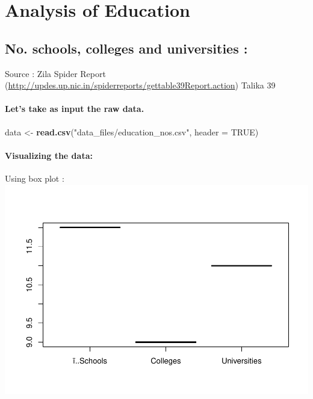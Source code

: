 \documentclass[]{article}
\newenvironment{Shaded}{\begin{snugshade}}{\end{snugshade}}
\newcommand{\KeywordTok}[1]{\textcolor[rgb]{0.13,0.29,0.53}{\textbf{#1}}}
\newcommand{\DataTypeTok}[1]{\textcolor[rgb]{0.13,0.29,0.53}{#1}}
\newcommand{\StringTok}[1]{\textcolor[rgb]{0.31,0.60,0.02}{#1}}
\newcommand{\OtherTok}[1]{\textcolor[rgb]{0.56,0.35,0.01}{#1}}
\newcommand{\NormalTok}[1]{#1}
\let\oldparagraph\paragraph
\renewcommand{\paragraph}[1]{\oldparagraph{#1}\mbox{}}
\begin{document}
\section{Analysis of Education}\label{analysis-of-education}

\subsection{No. schools, colleges and universities
:}\label{no.-schools-colleges-and-universities}

Source : Zila Spider Report
(\url{http://updes.up.nic.in/spiderreports/gettable39Report.action})
Talika 39

\paragraph{Let's take as input the raw
data.}\label{lets-take-as-input-the-raw-data.-4}

\begin{Shaded}
\begin{Highlighting}[]
\NormalTok{data <-}\StringTok{ }\KeywordTok{read.csv}\NormalTok{(}\StringTok{"data_files/education_nos.csv"}\NormalTok{, }\DataTypeTok{header =} \OtherTok{TRUE}\NormalTok{)}
\end{Highlighting}
\end{Shaded}

\paragraph{Visualizing the data:}\label{visualizing-the-data-4}

Using box plot :
\includegraphics{Report_files/figure-latex/unnamed-chunk-18-1.pdf}
\end{document}

